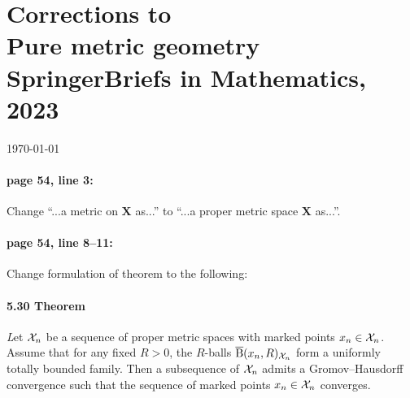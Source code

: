 \documentclass[twoside]{book}
\begin{document}
\pagestyle{empty}
\section*{Corrections to\\
Pure metric geometry\\
{\normalsize  SpringerBriefs in Mathematics, 2023}
}

\today

\bigskip

\paragraph{page 54, line 3:} Change ``...a metric on $\bm{X}$ as...'' to ``...a proper metric space $\bm{X}$ as...''.

\paragraph{page 54, line 8--11:} Change formulation of theorem to the following:

\paragraph{5.30 Theorem}{\textit Let $\mathcal{X}_n$ be a sequence of proper metric spaces with marked points $x_n\in \mathcal{X}_n$.
Assume that for any fixed $R>0$, the $R$-balls $\overline{\mathrm{B}}{}(x_n,R)_{\mathcal{X}_n}$ form a uniformly totally bounded family.
Then a subsequence of $\mathcal{X}_n$ admits a Gromov--Hausdorff convergence such that the sequence of marked points $x_n\in\mathcal{X}_n$ converges.}
\end{document}
